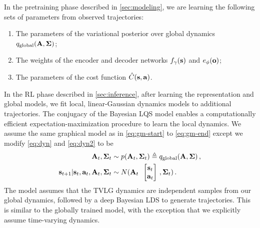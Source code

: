 In the pretraining phase described in \autoref{sec:modeling}, we are learning the following sets of parameters from observed trajectories:
\vspace{-.5em}
\begin{enumerate}
    \itemsep0em
    \item The parameters of the variational posterior over global dynamics $q_\textrm{global}(\mathbf{A}, \bm{\Sigma})$;
    \item The weights of the encoder and decoder networks $f_\gamma(\mathbf{s})$ and $e_\phi(\mathbf{o})$;
    \item The parameters of the cost function $\hat{C}(\mathbf{s}, \mathbf{a})$.
\end{enumerate}
\vspace{-.5em}
In the RL phase described in \autoref{sec:inference}, after learning the representation and global models, we fit local, linear-Gaussian dynamics models to additional trajectories. The conjugacy of the Bayesian LQS model enables a computationally efficient expectation-maximization procedure to learn the local dynamics. We assume the same graphical model as in \autoref{eq:gm-start} to \autoref{eq:gm-end} except we modify \autoref{eq:dyn} and \autoref{eq:dyn2} to be
\begin{align*}
    \dynmat_t, \dyncovar_t &\sim p(\dynmat_t, \dyncovar_t) \triangleq q_{\textrm{global}}(\dynmat, \dyncovar)\,,\\
    \state_{t + 1} | \state_t, \action_t, \dynmat_t, \dyncovar_t &\sim \N(\dynmat_t\colvec{\state_t\\\action_t}, \dyncovar_t)\,.
\end{align*}
The model assumes that the TVLG dynamics are independent samples from our global dynamics, followed by a deep Bayesian LDS to generate trajectories. This is similar to the globally trained model, with the exception that we explicitly assume time-varying dynamics.

